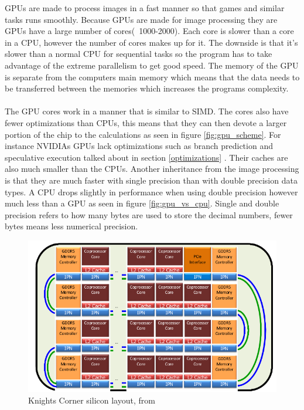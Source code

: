 \documentclass[10pt,a4paper]{report}
\begin{document}
GPUs are made to process images in a fast manner so that games and similar tasks runs smoothly\cite{cuda}. Because GPUs are made for image processing they are GPUs have a large number of cores(~1000-2000)\cite{cuda, nvtesla}. Each core is slower than a core in a CPU, however the number of cores makes up for it. The downside is that it's slower than a normal CPU for sequential tasks so the program has to take advantage of the extreme parallelism to get good speed\cite{cuda_best_practice}. The memory of the GPU is separate from the computers main memory which means that the data needs to be transferred between the memories which increases the programs complexity\cite{cuda}.\\
\\
The GPU cores work in a manner that is similar to SIMD\cite{cuda}. The cores also have fewer optimizations than CPUs, this means that they can then devote a larger portion of the chip to the calculations as seen in figure \ref{fig:gpu_scheme}. For instance NVIDIAs GPUs lack optimizations such as branch prediction and speculative execution talked about in section \ref{optimizations} \cite{cuda}. Their caches are also much smaller than the CPUs\cite{cuda}. Another inheritance from the image processing is that they are much faster with single precision than with double precision data types\cite{cuda, nvtesla}. A CPU drops slightly in performance when using double precision however much less than a GPU as seen in figure \ref{fig:gpu_vs_cpu}. Single and double precision refers to how many bytes are used to store the decimal numbers, fewer bytes means less numerical precision.

\begin{figure}[h]
    \centering
    \includegraphics[width=12cm]{knigths_corner_silicon_layout.png}
    \caption{Knights Corner silicon layout, from\cite{intel_knights_corner}}
    \label{fig:knights_corner_layout}
\end{figure}
\end{document}
